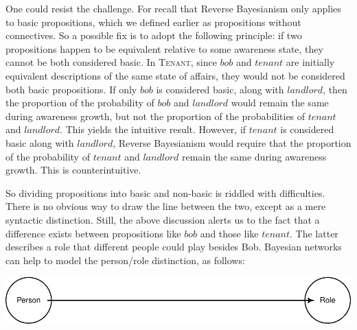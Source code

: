\documentclass[
  11pt,
  dvipsnames,enabledeprecatedfontcommands]{scrartcl}
\begin{document}
One could resist the challenge. For recall that Reverse Bayesianism only
applies to basic propositions, which we defined earlier as propositions
without connectives. So a possible fix is to adopt the following
principle: if two propositions happen to be equivalent relative to some
awareness state, they cannot be both considered basic. In
\textsc{Tenant}, since \(bob\) and \(tenant\) are initially equivalent
descriptions of the same state of affairs, they would not be considered
both basic propositions. If only \(bob\) is considered basic, along with
\(landlord\), then the proportion of the probability of \(bob\) and
\(landlord\) would remain the same during awareness growth, but not the
proportion of the probabilities of \(tenant\) and \(landlord\). This
yields the intuitive result. However, if \(tenant\) is considered basic
along with \(landlord\), Reverse Bayesianism would require that the
proportion of the probability of \(tenant\) and \(landlord\) remain the
same during awareness growth. This is counterintuitive.

So dividing propositions into basic and non-basic is riddled with
difficulties. There is no obvious way to draw the line between the two,
except as a mere syntactic distinction. Still, the above discussion
alerts us to the fact that a difference exists between propositions like
\(bob\) and those like \(tenant\). The latter describes a role that
different people could play besides Bob. Bayesian networks can help to
model the person/role distinction, as follows:

\begin{center}\includegraphics[width=0.5\linewidth,height=0.3\textheight]{ReplyToSteeleStefansson5_files/figure-latex/tenantsDAG-new-1} \end{center}
\end{document}
